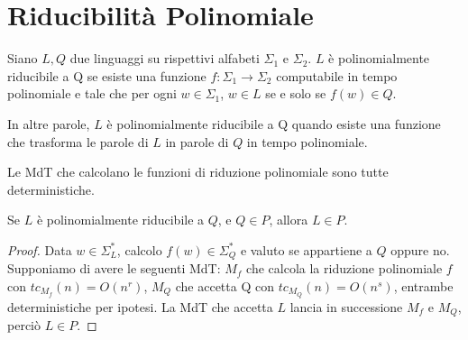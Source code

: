 \section{Riducibilità Polinomiale}

\begin{defn}
	Siano $L, Q$ due linguaggi su rispettivi alfabeti $\Sigma_1$ e $\Sigma_2$. $L$ è polinomialmente riducibile a Q se esiste una funzione $f : \Sigma_1 \rightarrow \Sigma_2$ computabile in tempo polinomiale e tale che per ogni $w \in \Sigma_1$, $w \in L$ se e solo se $f(w) \in Q$.
\end{defn}

In altre parole, $L$ è polinomialmente riducibile a Q quando esiste una funzione che trasforma le parole di $L$ in parole di $Q$ in tempo polinomiale. \\

\begin{remark}
	Le MdT che calcolano le funzioni di riduzione polinomiale sono tutte deterministiche.
\end{remark}

\vspace{0.25cm}

\begin{defn} 
	Se $L$ è polinomialmente riducibile a $Q$, e $Q \in P$, allora $L \in P$.
\end{defn}

\begin{proof}
	Data $w \in \Sigma_L^\ast$, calcolo $f(w) \in \Sigma_Q^\ast$ e valuto se appartiene a $Q$ oppure no. Supponiamo di avere le seguenti MdT: $M_f$ che calcola la riduzione polinomiale $f$ con $tc_{M_f}(n) = O(n^r)$, $M_Q$ che accetta Q con $tc_{M_Q}(n) = O(n^s)$, entrambe deterministiche per ipotesi. La MdT che accetta $L$ lancia in successione $M_f$ e $M_Q$, perciò $L \in P$.
\end{proof}
